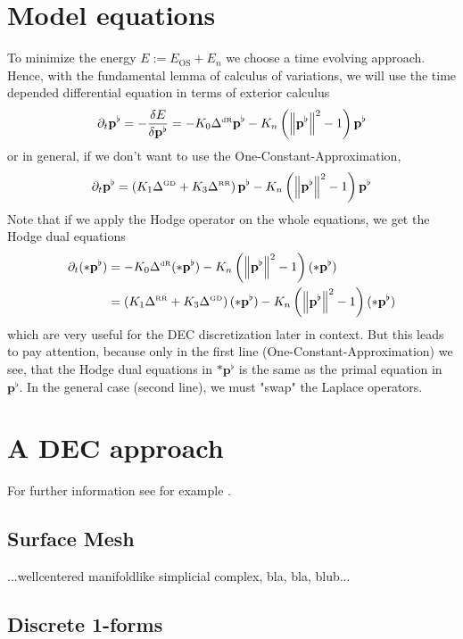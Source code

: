 \documentclass{scrartcl}
\newcommand{\pfl}{\mathbf{p}^{\flat}}
\newcommand{\EOS}{E_{\text{OS}}}
\newcommand{\EN}{E_{n}}
\newcommand{\LB}{\Delta^{\text{\tiny RR}}}
\newcommand{\LCB}{\Delta^{\text{\tiny GD}}}
\newcommand{\LDR}{\Delta^{\text{\tiny dR}}}
\begin{document}
\section{Model equations}
  To minimize the energy \( E := \EOS + \EN \) we choose a time evolving approach. 
  Hence, with the fundamental lemma of calculus of variations, we will use the time depended differential equation in terms of exterior
  calculus
  \begin{align}
    \partial_{t}\pfl = -\frac{\delta E}{\delta\pfl}
                     = -K_{0}\LDR\pfl - K_{n} \left( \left\| \pfl \right\|^{2} - 1 \right)\pfl
  \end{align}
  or in general, if we don't want to use the One-Constant-Approximation,
  \begin{align}
    \partial_{t}\pfl = \left( K_{1}\LCB + K_{3}\LB\right)\pfl - K_{n} \left( \left\| \pfl \right\|^{2} - 1 \right)\pfl
  \end{align}
  Note that if we apply the Hodge operator on the whole equations, we get the Hodge dual equations
  \begin{align}
    \partial_{t}(*\pfl) &= -K_{0}\LDR (*\pfl) - K_{n} \left( \left\| \pfl \right\|^{2} - 1 \right)(*\pfl) \\
                        &=  \left( K_{1}\LB + K_{3}\LCB\right) (*\pfl) - K_{n} \left( \left\| \pfl \right\|^{2} - 1 \right)(*\pfl)
  \end{align}
  which are very useful for the DEC discretization later in context.
  But this leads to pay attention, because only in the first line (One-Constant-Approximation) we see, 
  that the Hodge dual equations in \( *\pfl \) is the same as the primal equation in \( \pfl \). 
  In the general case (second line), we must "swap" the Laplace operators.



\section{A DEC approach}
  
For further information see for example \cite{whitney,hirani}. 

  \subsection{Surface Mesh}
    ...wellcentered manifoldlike simplicial complex, bla, bla, blub...

  \subsection{Discrete 1-forms}
\end{document}
